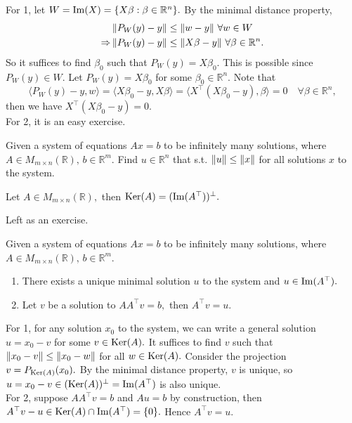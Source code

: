 \begin{pfbox}
    For 1, let $W=\operatorname{Im}(X)=\{X\beta:\beta\in\mathbb{R}^n\}.$
    By the minimal distance property, 
    \begin{align*}
                &\left\lVert P_W(y)-y \right\rVert\le\left\lVert w-y \right\rVert\,\forall w\in W\\
     \Rightarrow &\left\lVert P_W(y)-y \right\rVert\le\left\lVert X\beta-y \right\rVert\,\forall \beta\in\mathbb{R}^n.
    \end{align*}
    So it suffices to find $\beta_0$ such that $P_W(y)=X\beta_0.$
    This is possible since $P_W(y)\in W.$
    Let $P_W(y)=X\beta_0$ for some $\beta_0\in\mathbb{R}^n.$
    Note that $$\langle P_W(y)-y, w\rangle = \langle X\beta_0-y, X\beta\rangle = \langle X^\top (X\beta_0-y), \beta\rangle=0\quad\forall \beta\in\mathbb{R}^n,$$
    then we have $X^\top (X\beta_0-y)=0.$\\

    For 2, it is an easy exercise.
\end{pfbox}



\begin{question}
        Given a system of equations $Ax=b$ to be infinitely many solutions, where $A\in M_{m\times n}(\mathbb{R}),\, b\in \mathbb{R}^m$. Find $u\in\mathbb{R}^n$ that s.t. $\left\lVert u \right\rVert\le\left\lVert x \right\rVert$ for all solutions $x$ to the system.
\end{question}

\begin{theorem}
    Let $A\in M_{m\times n}(\mathbb{R}),$ then $\operatorname{Ker}(A)=(\operatorname{Im}(A^\top))^\perp.$ 
\end{theorem}

\begin{pfbox}
    Left as an exercise.
\end{pfbox}


\begin{theorem}
  Given a system of equations $Ax=b$ to be infinitely many solutions, where $A\in M_{m\times n}(\mathbb{R}),\, b\in \mathbb{R}^m$. 
  \begin{enumerate}
    \item There exists a unique minimal solution $u$ to the system and $u\in\operatorname{Im}(A^\top).$
    \item Let $v$ be a solution to $AA^\top v=b,$ then $A^\top v=u.$ 
  \end{enumerate}
\end{theorem}

\begin{pfbox}
    For 1, for any solution $x_0$ to the system, we can write a general solution $u=x_0-v$ for some $v\in\operatorname{Ker}(A).$
    It suffices to find $v$ such that $\left\lVert x_0-v \right\rVert\le\left\lVert x_0-w \right\rVert$ for all $w\in\operatorname{Ker}(A).$ Consider the projection $v=P_{\operatorname{Ker}(A)}(x_0).$
    By the minimal distance property, $v$ is unique, so $u=x_0-v\in(\operatorname{Ker}(A))^\perp=\operatorname{Im}(A^\top)$ is also unique.\\

    For 2, suppose $AA^\top v=b$ and $Au=b$ by construction, then $A^\top v-u\in\operatorname{Ker}(A)\cap\operatorname{Im}(A^\top)=\{0\}.$
    Hence $A^\top v=u.$ 
\end{pfbox}


